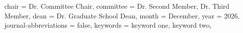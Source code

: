 {  %
  chair          = {Dr. Committee Chair},
  committee      = {Dr. Second Member, Dr. Third Member},  %
  dean           = {Dr. Graduate School Dean},
  month          = {December},
  year           = {2026},
  journal-abbreviations = {false},
  keywords       = {keyword one, keyword two},
}

